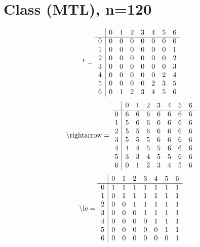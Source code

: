 \documentclass[11pt]{article}
\begin{document}
\section{Class (MTL), n=120}
\[\text{*} = 
\begin{array}{r | r r r r r r r}
 & 0 & 1 & 2 & 3 & 4 & 5 & 6 \\ \hline
0 & 0 & 0 & 0 & 0 & 0 & 0 & 0 \\
1 & 0 & 0 & 0 & 0 & 0 & 0 & 1 \\
2 & 0 & 0 & 0 & 0 & 0 & 0 & 2 \\
3 & 0 & 0 & 0 & 0 & 0 & 0 & 3 \\
4 & 0 & 0 & 0 & 0 & 0 & 2 & 4 \\
5 & 0 & 0 & 0 & 0 & 2 & 3 & 5 \\
6 & 0 & 1 & 2 & 3 & 4 & 5 & 6 \\
\end{array}
\]
\[\text{\textbackslash rightarrow} = 
\begin{array}{r | r r r r r r r}
 & 0 & 1 & 2 & 3 & 4 & 5 & 6 \\ \hline
0 & 6 & 6 & 6 & 6 & 6 & 6 & 6 \\
1 & 5 & 6 & 6 & 6 & 6 & 6 & 6 \\
2 & 5 & 5 & 6 & 6 & 6 & 6 & 6 \\
3 & 5 & 5 & 5 & 6 & 6 & 6 & 6 \\
4 & 4 & 4 & 5 & 5 & 6 & 6 & 6 \\
5 & 3 & 3 & 4 & 5 & 5 & 6 & 6 \\
6 & 0 & 1 & 2 & 3 & 4 & 5 & 6 \\
\end{array}
\]
\[\text{\textbackslash le} = 
\begin{array}{r | r r r r r r r}
 & 0 & 1 & 2 & 3 & 4 & 5 & 6 \\ \hline
0 & 1 & 1 & 1 & 1 & 1 & 1 & 1 \\
1 & 0 & 1 & 1 & 1 & 1 & 1 & 1 \\
2 & 0 & 0 & 1 & 1 & 1 & 1 & 1 \\
3 & 0 & 0 & 0 & 1 & 1 & 1 & 1 \\
4 & 0 & 0 & 0 & 0 & 1 & 1 & 1 \\
5 & 0 & 0 & 0 & 0 & 0 & 1 & 1 \\
6 & 0 & 0 & 0 & 0 & 0 & 0 & 1 \\
\end{array}
\]
\end{document}
